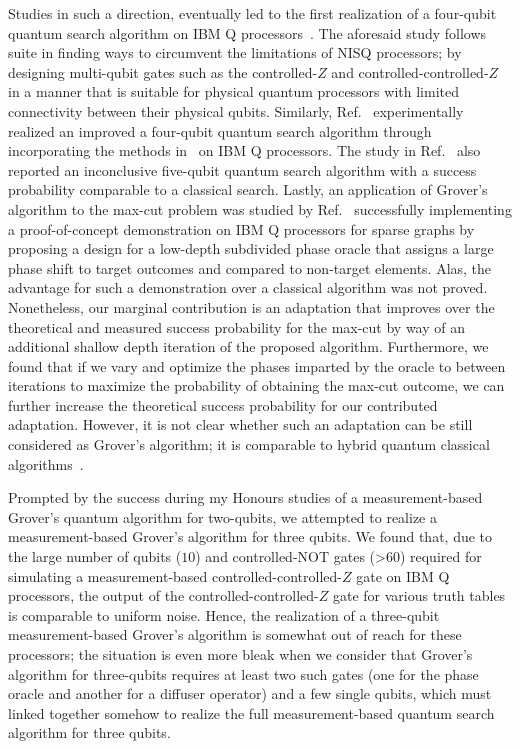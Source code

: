 \clearpage
\noindent
Studies in such a direction, eventually led to the first realization of a four-qubit quantum search algorithm on IBM Q processors~\cite{Gwinner_2020}. The aforesaid study follows suite in finding ways to circumvent the limitations of \acs{NISQ} processors; by designing multi-qubit gates such as the controlled-$Z$ and controlled-controlled-$Z$ in a manner that is suitable for physical quantum processors with limited connectivity between their physical qubits. Similarly, Ref.~\cite{Zhang_2021} experimentally realized an improved a four-qubit quantum search algorithm through incorporating the methods in~\cite{Zhang_2020} on IBM Q processors. The study in Ref.~\cite{Zhang_2021} also reported an inconclusive five-qubit quantum search algorithm with a success probability comparable to a classical search. Lastly, an application of Grover's algorithm to the \acs{max-cut} problem was studied by Ref.~\cite{Satoh_2020} successfully implementing a proof-of-concept demonstration on IBM Q processors for sparse graphs by proposing a design for a low-depth subdivided phase oracle that assigns a large phase shift to target outcomes and compared to non-target elements. Alas, the advantage for such a demonstration over a classical algorithm was not proved. Nonetheless, our marginal contribution is an adaptation that improves over the theoretical and measured success probability for the \acs{max-cut} by way of an additional shallow depth iteration of the proposed algorithm. Furthermore, we found that if we vary and optimize the phases imparted by the oracle to between iterations to maximize the probability of obtaining the \acs{max-cut} outcome, we can further increase the theoretical success probability for our contributed adaptation. However, it is not clear whether such an adaptation can be still considered as Grover's algorithm; it is comparable to hybrid quantum classical algorithms~\cite{Farhi_2014,Peruzzo_2014,Morales_2018}.

\bigskip
\noindent
Prompted by the success during my Honours studies of a measurement-based Grover's quantum algorithm for two-qubits, we attempted to realize a measurement-based Grover's algorithm for three qubits. We found that, due to the large number of qubits ($10$) and controlled-NOT gates (>$60$) required for simulating a measurement-based controlled-controlled-$Z$ gate on IBM Q processors, the output of the controlled-controlled-$Z$ gate for various truth tables is comparable to uniform noise. Hence, the realization of a three-qubit measurement-based Grover's algorithm is somewhat out of reach for these processors; the situation is even more bleak when we consider that Grover's algorithm for three-qubits requires at least two such gates (one for the phase oracle and another for a diffuser operator) and a few single qubits, which must linked together somehow to realize the full measurement-based quantum search algorithm for three qubits.


